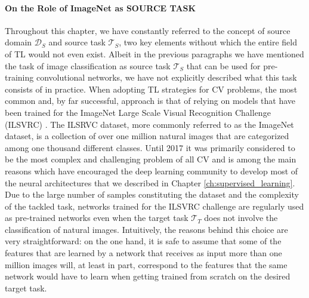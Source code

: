\paragraph{\textbf{\uppercase{O}n the \uppercase{R}ole of \uppercase{I}mageNet as \uppercase{Source} \uppercase{Task}}} Throughout this chapter, we have constantly referred to the concept of source domain $\mathcal{D}_S$ and source task $\mathcal{T}_S$, two key elements without which the entire field of TL would not even exist. Albeit in the previous paragraphs we have mentioned the task of image classification as source task $\mathcal{T}_S$ that can be used for pre-training convolutional networks, we have not explicitly described what this task consists of in practice. When adopting TL strategies for CV problems, the most common and, by far successful, approach is that of relying on models that have been trained for the ImageNet Large Scale Visual Recognition Challenge (ILSVRC) \cite{russakovsky2015imagenet}. The ILSRVC dataset, more commonly referred to as the ImageNet dataset, is a collection of over one million natural images that are categorized among one thousand different classes. Until 2017 it was primarily considered to be the most complex and challenging problem of all CV and is among the main reasons which have encouraged the deep learning community to develop most of the neural architectures that we described in Chapter \ref{ch:supervised_learning}. Due to the large number of samples constituting the dataset and the complexity of the tackled task, networks trained for the ILSVRC challenge are regularly used as pre-trained networks even when the target task $\mathcal{T}_T$ does not involve the classification of natural images. Intuitively, the reasons behind this choice are very straightforward: on the one hand, it is safe to assume that some of the features that are learned by a network that receives as input more than one million images will, at least in part, correspond to the features that the same network would have to learn when getting trained from scratch on the desired target task.

